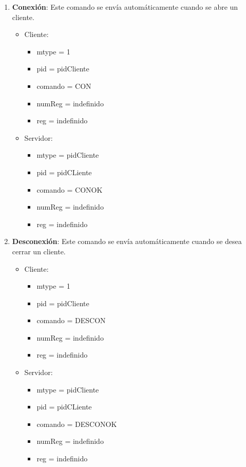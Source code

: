 \documentclass[a4paper,10pt]{article}
\begin{document}
	\begin{enumerate}
		\item{\bf Conexi\'on}: Este comando se env\'ia autom\'aticamente cuando se abre un cliente.
			\begin{itemize}
				\item Cliente:
				\begin{itemize}
					\item[]mtype  = 1
					\item[]pid  = pidCliente
					\item[]comando  = CON
					\item[]numReg  = indefinido
					\item[]reg  = indefinido
				\end{itemize}
				\item Servidor:
				\begin{itemize}
					\item[]mtype = pidCliente 
					\item[]pid = pidCLiente
					\item[]comando = CONOK
					\item[]numReg = indefinido
					\item[]reg = indefinido
				\end{itemize}
			\end{itemize}
		\item{\bf Desconexi\'on}: Este comando se env\'ia autom\'aticamente cuando se desea cerrar un cliente.
			\begin{itemize}
				\item Cliente:
				\begin{itemize}
					\item[]mtype = 1
					\item[]pid = pidCliente
					\item[]comando = DESCON 
					\item[]numReg = indefinido
					\item[]reg = indefinido
				\end{itemize}
				\item Servidor:
				\begin{itemize}
					\item[]mtype = pidCliente 
					\item[]pid = pidCLiente
					\item[]comando = DESCONOK 
					\item[]numReg = indefinido
					\item[]reg = indefinido
				\end{itemize}

\end{itemize}
\end{enumerate}
\end{document}
